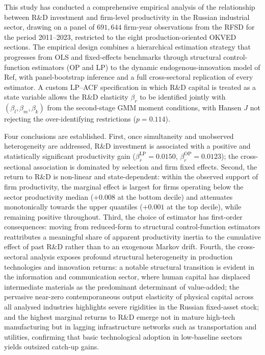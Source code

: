 \documentclass[a4paper, 12pt]{article}
\def\textcite#1{Ref}%
\begin{document}
This study has conducted a comprehensive empirical analysis of the relationship between R\&D investment and firm-level productivity in the Russian industrial sector, drawing on a panel of $691{,}644$ firm-year observations from the RFSD for the period 2011--2023, restricted to the eight production-oriented OKVED sections. The empirical design combines a hierarchical estimation strategy that progresses from OLS and fixed-effects benchmarks through structural control-function estimators (OP and LP) to the dynamic endogenous-innovation model of \textcite{doraszelski2013r}, with panel-bootstrap inference and a full cross-sectoral replication of every estimator. A custom LP--ACF specification in which R\&D capital is treated as a state variable allows the R\&D elasticity $\beta_r$ to be identified jointly with $(\beta_l, \beta_m, \beta_k)$ from the second-stage GMM moment conditions, with Hansen $J$ not rejecting the over-identifying restrictions ($p = 0.114$).

Four conclusions are established. First, once simultaneity and unobserved heterogeneity are addressed, R\&D investment is associated with a positive and statistically significant productivity gain ($\beta_r^{\text{LP}} = 0.0150$, $\beta_r^{\text{OP}} = 0.0123$); the cross-sectional association is dominated by selection and firm fixed effects. Second, the return to R\&D is non-linear and state-dependent: within the observed support of firm productivity, the marginal effect is largest for firms operating below the sector productivity median ($+0.008$ at the bottom decile) and attenuates monotonically towards the upper quantiles ($+0.001$ at the top decile), while remaining positive throughout. Third, the choice of estimator has first-order consequences: moving from reduced-form to structural control-function estimators reattributes a meaningful share of apparent productivity inertia to the cumulative effect of past R\&D rather than to an exogenous Markov drift. Fourth, the cross-sectoral analysis exposes profound structural heterogeneity in production technologies and innovation returns: a notable structural transition is evident in the information and communication sector, where human capital has displaced intermediate materials as the predominant determinant of value-added; the pervasive near-zero contemporaneous output elasticity of physical capital across all analysed industries highlights severe rigidities in the Russian fixed-asset stock; and the highest marginal returns to R\&D emerge not in mature high-tech manufacturing but in lagging infrastructure networks such as transportation and utilities, confirming that basic technological adoption in low-baseline sectors yields outsized catch-up gains.
\end{document}
